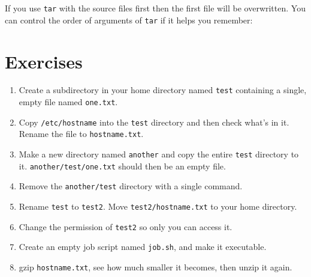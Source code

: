 If you use \lstinline|tar| with the source files first then the first file will be
overwritten. You can control the order of arguments of \lstinline|tar| if it helps you
remember:

\begin{prompt}
\end{prompt}

\section{Exercises}

\begin{enumerate}
    \item Create a subdirectory in your home directory named \lstinline|test| containing
        a single, empty file named \lstinline|one.txt|.
    \item Copy \lstinline|/etc/hostname| into the \lstinline|test| directory and then check what's
        in it. Rename the file to \lstinline|hostname.txt|.
    \item Make a new directory named \lstinline|another| and copy the entire \lstinline|test|
        directory to it. \lstinline|another/test/one.txt| should then be an empty file.
    \item Remove the \lstinline|another/test| directory with a single command.
    \item Rename \lstinline|test| to \lstinline|test2|. Move \lstinline|test2/hostname.txt| to your
        home directory.
    \item Change the permission of \lstinline|test2| so only you can access it.
    \item Create an empty job script named \lstinline|job.sh|, and make it executable.
    \item gzip \lstinline|hostname.txt|, see how much smaller it becomes, then unzip it again.
\end{enumerate}
